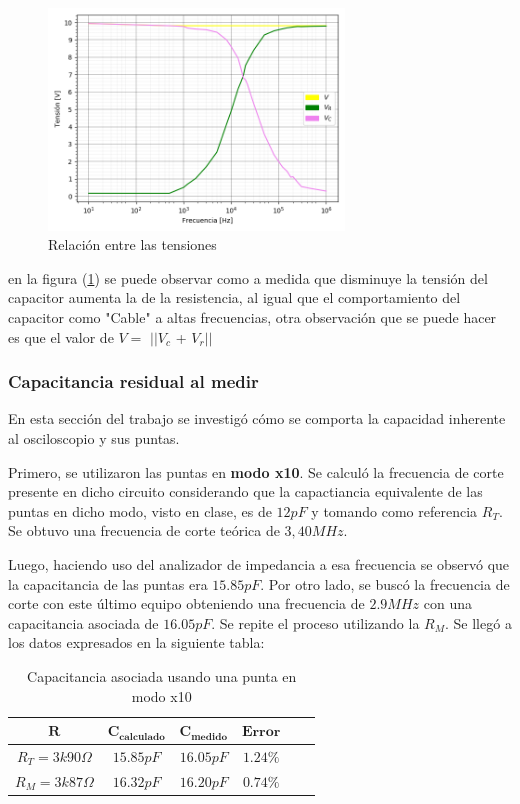 \documentclass[11pt, a4paper]{article}
\begin{document}
\begin{figure}[H]
	\centering
	\includegraphics[width=0.7\textwidth]{Tensiones.png}
	\caption{Relación entre las tensiones} 
	\label{graf:Tensiones}
\end{figure}
en la figura (\ref{graf:Tensiones}) se puede observar como a medida que disminuye la tensión del capacitor aumenta la de la resistencia, al igual que el comportamiento del capacitor como "Cable" a altas frecuencias,  otra observación que se puede hacer es que el valor de $V=$ $ ||V_c$ + $V_r||$ 


\subsubsection*{Capacitancia residual al medir}

En esta sección del trabajo se investigó cómo se comporta la capacidad inherente al osciloscopio y sus puntas. 

Primero, se utilizaron las puntas en \textbf{modo x10}. Se calculó la frecuencia de corte presente en dicho circuito considerando que la capactiancia equivalente de las puntas en dicho modo, visto en clase, es de $12 pF$ y tomando como referencia $R_T$. Se obtuvo una frecuencia de corte teórica de $3,40MHz$. \par 
Luego, haciendo uso del analizador de impedancia a esa frecuencia se observó que la capacitancia de las puntas era $15.85 pF$. Por otro lado, se buscó la frecuencia de corte con este último equipo obteniendo una frecuencia de $2.9 MHz$ con una capacitancia asociada de $16.05pF$. Se repite el proceso utilizando la $R_M$. Se llegó a los datos expresados en la siguiente tabla:
 \begin{center}
     \begin{table}[ht]
     \centering
	 \renewcommand{\arraystretch}{1.1}
         \begin{tabular}{c c c c c c}
            \hline 
             $\bm{R}$ &  $\bm{C_{calculado}}$ &    $\bm{C_{medido}}$   &  $\bm{Error}$\\ \hline
             $R_T = 3k90\Omega$  & $15.85 pF$ & $16.05 pF$ & $1.24\%$ \\  
             $R_M = 3k87\Omega$ & $16.32 pF$ & $16.20 pF$ & $0.74 \%$ \\   \hline
        \end{tabular}
        \caption{Capacitancia asociada usando una punta en modo x10}
        \label{table:valores_punta_x10}
    \end{table}
\end{center}
\end{document}
